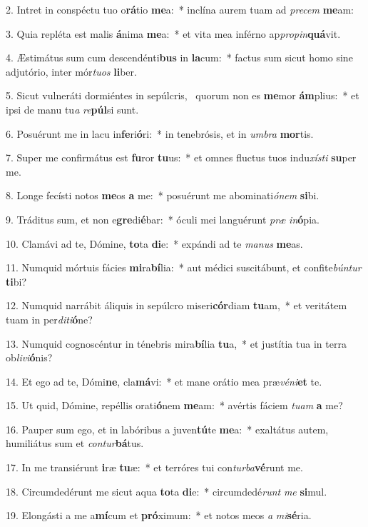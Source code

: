 2. Intret in conspéctu tuo o\textbf{rá}tio \textbf{me}a:~*  inclína aurem tuam ad \textit{pre}\textit{cem} \textbf{me}am:\

3. Quia repléta est malis \textbf{á}nima \textbf{me}a:~*  et vita mea inférno ap\textit{pro}\textit{pin}\textbf{quá}vit.\

4. Æstimátus sum cum descendénti\textbf{bus} in \textbf{la}cum:~*  factus sum sicut homo sine adjutório, inter mór\textit{tu}\textit{os} \textbf{li}ber.\

5. Sicut vulneráti dormiéntes in sepúlcris, \dag\  quorum non es \textbf{me}mor \textbf{ám}plius:~*  et ipsi de manu tu\textit{a} \textit{re}\textbf{púl}si sunt.\

6. Posuérunt me in lacu in\textbf{fe}ri\textbf{ó}ri:~*  in tenebrósis, et in \textit{um}\textit{bra} \textbf{mor}tis.\

7. Super me confirmátus est \textbf{fu}ror \textbf{tu}us:~*  et omnes fluctus tuos indu\textit{xís}\textit{ti} \textbf{su}per me.\

8. Longe fecísti notos \textbf{me}os \textbf{a} me:~*  posuérunt me abominati\textit{ó}\textit{nem} \textbf{si}bi.\

9. Tráditus sum, et non e\textbf{gre}di\textbf{é}bar:~*  óculi mei languérunt \textit{præ} \textit{in}\textbf{ó}pia.\

10. Clamávi ad te, Dómine, \textbf{to}ta \textbf{di}e:~*  expándi ad te \textit{ma}\textit{nus} \textbf{me}as.\

11. Numquid mórtuis fácies \textbf{mi}ra\textbf{bí}lia:~*  aut médici suscitábunt, et confite\textit{bún}\textit{tur} \textbf{ti}bi?\

12. Numquid narrábit áliquis in sepúlcro miseri\textbf{cór}diam \textbf{tu}am,~*  et veritátem tuam in per\textit{di}\textit{ti}\textbf{ó}ne?\

13. Numquid cognoscéntur in ténebris mira\textbf{bí}lia \textbf{tu}a,~*  et justítia tua in terra ob\textit{li}\textit{vi}\textbf{ó}nis?\

14. Et ego ad te, Dómi\textbf{ne}, cla\textbf{má}vi:~*  et mane orátio mea præ\textit{vé}\textit{ni}\textbf{et} te.\

15. Ut quid, Dómine, repéllis orati\textbf{ó}nem \textbf{me}am:~*  avértis fáciem \textit{tu}\textit{am} \textbf{a} me?\

16. Pauper sum ego, et in labóribus a juven\textbf{tú}te \textbf{me}a:~*  exaltátus autem, humiliátus sum et \textit{con}\textit{tur}\textbf{bá}tus.\

17. In me transiérunt \textbf{i}ræ \textbf{tu}æ:~*  et terróres tui con\textit{tur}\textit{ba}\textbf{vé}runt me.\

18. Circumdedérunt me sicut aqua \textbf{to}ta \textbf{di}e:~*  circumdedé\textit{runt} \textit{me} \textbf{si}mul.\

19. Elongásti a me a\textbf{mí}cum et \textbf{pró}ximum:~*  et notos meos \textit{a} \textit{mi}\textbf{sé}ria.\

